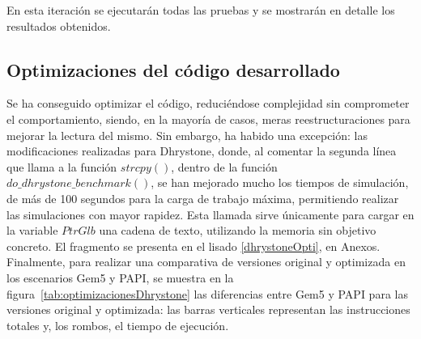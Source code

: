 En esta iteración se ejecutarán todas las pruebas y se mostrarán en detalle los resultados obtenidos.

\subsection{Optimizaciones del código desarrollado}
\label{subsct:optimizaciones}

Se ha conseguido optimizar el código, reduciéndose complejidad sin comprometer el comportamiento, siendo, en la mayoría de casos, meras reestructuraciones para mejorar la lectura del mismo. Sin embargo, ha habido una excepción: las modificaciones realizadas para Dhrystone, donde, al comentar la segunda línea que llama a la función $strcpy()$, dentro de la función $do\_dhrystone\_benchmark()$, se han mejorado mucho los tiempos de simulación, de más de 100 segundos para la carga de trabajo máxima, permitiendo realizar las simulaciones con mayor rapidez. Esta llamada sirve únicamente para cargar en la variable $PtrGlb$ una cadena de texto, utilizando la memoria sin objetivo concreto. El fragmento se presenta en el lisado \ref{dhrystoneOpti}, en Anexos. Finalmente, para realizar una comparativa de versiones original y optimizada en los escenarios Gem5 y PAPI, se muestra en la figura~\ref{tab:optimizacionesDhrystone} las diferencias entre Gem5 y PAPI para las versiones original y optimizada: las barras verticales representan las instrucciones totales y, los rombos, el tiempo de ejecución.

